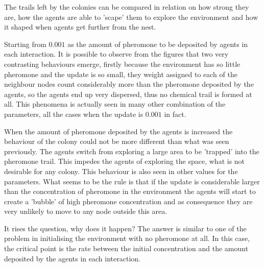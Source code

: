 The trails left by the colonies can be compared in relation on how strong they are, how the agents are able to 'scape' them to explore the environment and how it shaped when agents get further from the nest.

Starting from $0.001$ as the amount of pheromone to be deposited by agents in each interaction. It is possible to observe from the figures that two very contrasting behaviours emerge, firstly because the environment has so little pheromone and the update is so small, they weight assigned to each of the neighbour nodes count considerably more than the pheromone deposited by the agents, so the agents end up very dispersed, thus no chemical trail is formed at all. This phenomena is actually seen in many other combination of the parameters, all the cases when the update is $0.001$ in fact. 

When the amount of pheromone deposited by the agents is increased the behaviour of the colony could not be more different than what was seen previously. The agents switch from exploring a large area to be 'trapped' into the pheromone trail. This impedes the agents of exploring the space, what is not desirable for any colony. This behaviour is also seen in other values for the parameters. What seems to be the rule is that if the update is considerable larger than the concentration of pheromone in the environment the agents will start to create a 'bubble' of high pheromone concentration and as consequence they are very unlikely to move to any node outside this area.

It rises the question, why does it happen? The answer is similar to one of the problem in initialising the environment with no pheromone at all. In this case, the critical point is the rate between the initial concentration and the amount deposited by the agents in each interaction.


